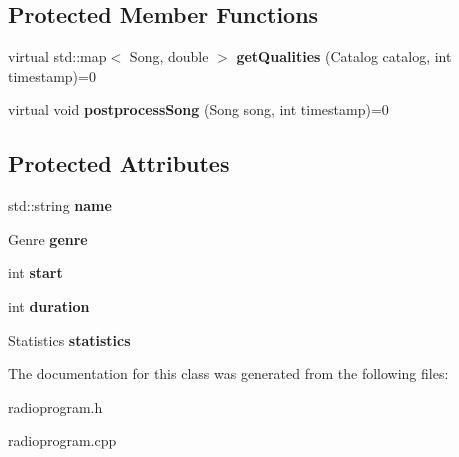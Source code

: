 \subsection*{Protected Member Functions}
\begin{DoxyCompactItemize}
\item 
virtual std\+::map$<$ Song, double $>$ {\bfseries get\+Qualities} (Catalog catalog, int timestamp)=0\hypertarget{class_radio_program___a83a524f556b517f42401e28115e5ccfc}{}\label{class_radio_program___a83a524f556b517f42401e28115e5ccfc}

\item 
virtual void {\bfseries postprocess\+Song} (Song song, int timestamp)=0\hypertarget{class_radio_program___ab862ebc2865ee85472029f4f4dbea3f8}{}\label{class_radio_program___ab862ebc2865ee85472029f4f4dbea3f8}

\end{DoxyCompactItemize}
\subsection*{Protected Attributes}
\begin{DoxyCompactItemize}
\item 
std\+::string {\bfseries name}\hypertarget{class_radio_program___a67daa7da22d48eb820299db912a8bcd9}{}\label{class_radio_program___a67daa7da22d48eb820299db912a8bcd9}

\item 
Genre {\bfseries genre}\hypertarget{class_radio_program___a2d91fcad74fad26085757923f269d9d9}{}\label{class_radio_program___a2d91fcad74fad26085757923f269d9d9}

\item 
int {\bfseries start}\hypertarget{class_radio_program___a496269bda247969a56f0dc7ccb169c03}{}\label{class_radio_program___a496269bda247969a56f0dc7ccb169c03}

\item 
int {\bfseries duration}\hypertarget{class_radio_program___a7fa75a28695c1b571bf529bc4e90cab5}{}\label{class_radio_program___a7fa75a28695c1b571bf529bc4e90cab5}

\item 
Statistics {\bfseries statistics}\hypertarget{class_radio_program___a9978ec8a87c81907594efcea1408501b}{}\label{class_radio_program___a9978ec8a87c81907594efcea1408501b}

\end{DoxyCompactItemize}


The documentation for this class was generated from the following files\+:\begin{DoxyCompactItemize}
\item 
radioprogram.\+h\item 
radioprogram.\+cpp\end{DoxyCompactItemize}

